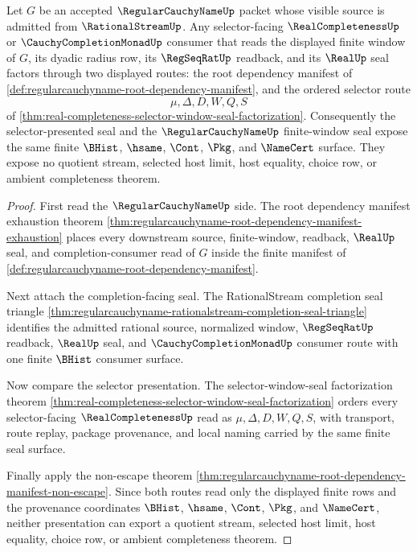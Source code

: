 \begin{theorem}
\label{thm:regularcauchyname-real-completion-selector-seal-compatibility}
Let $G$ be an accepted $\RegularCauchyNameUp$ packet whose visible source is admitted from $\RationalStreamUp$. Any selector-facing $\RealCompletenessUp$ or $\CauchyCompletionMonadUp$ consumer that reads the displayed finite window of $G$, its dyadic radius row, its $\RegSeqRatUp$ readback, and its $\RealUp$ seal factors through two displayed routes: the root dependency manifest of \autoref{def:regularcauchyname-root-dependency-manifest}, and the ordered selector route
$$
\mu,\Delta,D,W,Q,S
$$
of \autoref{thm:real-completeness-selector-window-seal-factorization}. Consequently the selector-presented seal and the $\RegularCauchyNameUp$ finite-window seal expose the same finite $\BHist$, $\hsame$, $\Cont$, $\Pkg$, and $\NameCert$ surface. They expose no quotient stream, selected host limit, host equality, choice row, or ambient completeness theorem.
\end{theorem}
\begin{proof}
First read the $\RegularCauchyNameUp$ side. The root dependency manifest exhaustion theorem \autoref{thm:regularcauchyname-root-dependency-manifest-exhaustion} places every downstream source, finite-window, readback, $\RealUp$ seal, and completion-consumer read of $G$ inside the finite manifest of \autoref{def:regularcauchyname-root-dependency-manifest}.

Next attach the completion-facing seal. The RationalStream completion seal triangle \autoref{thm:regularcauchyname-rationalstream-completion-seal-triangle} identifies the admitted rational source, normalized window, $\RegSeqRatUp$ readback, $\RealUp$ seal, and $\CauchyCompletionMonadUp$ consumer route with one finite $\BHist$ consumer surface.

Now compare the selector presentation. The selector-window-seal factorization theorem \autoref{thm:real-completeness-selector-window-seal-factorization} orders every selector-facing $\RealCompletenessUp$ read as $\mu,\Delta,D,W,Q,S$, with transport, route replay, package provenance, and local naming carried by the same finite seal surface.

Finally apply the non-escape theorem \autoref{thm:regularcauchyname-root-dependency-manifest-non-escape}. Since both routes read only the displayed finite rows and the provenance coordinates $\BHist$, $\hsame$, $\Cont$, $\Pkg$, and $\NameCert$, neither presentation can export a quotient stream, selected host limit, host equality, choice row, or ambient completeness theorem.
\end{proof}

